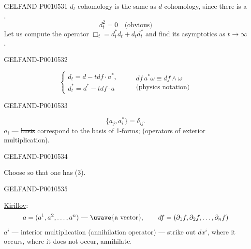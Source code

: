 \begin{GelfandAdjacentEvidence}{GELFAND-P001053}{1}
$d_t$-cohomology is the same as $d$-cohomology, since there is a .
\[
d_t^2=0\quad\text{(obvious)}
\]
Let us compute the operator $\Box_t=d_t^*d_t+d_td_t^*$ and find its asymptotics
as $t\to\infty$.
\end{GelfandAdjacentEvidence}
\begin{GelfandAdjacentEvidence}{GELFAND-P001053}{2}

\begin{equation*}
\begin{cases}
d_t=d-tdf\cdot a^*,\\
d_t^*=d^*-tdf\cdot a
\end{cases}
\qquad
\begin{gathered}
df\,a^*\omega\equiv df\wedge\omega\\
\text{(physics notation)}
\end{gathered}
\tag{2}
\end{equation*}
\end{GelfandAdjacentEvidence}
\begin{GelfandAdjacentEvidence}{GELFAND-P001053}{3}

\begin{equation*}
\{a_j,a_i^*\}=\delta_{ij}.
\tag{3}
\end{equation*}
$a_i$ — \sout{basis} correspond to the basis of 1-forms;
(operators of exterior multiplication).
\end{GelfandAdjacentEvidence}
\begin{GelfandAdjacentEvidence}{GELFAND-P001053}{4}


Choose so that one has (3).
\end{GelfandAdjacentEvidence}
\begin{GelfandAdjacentEvidence}{GELFAND-P001053}{5}


\underline{Kirillov}:
\[
a=(a^1,a^2,\ldots,a^n)\text{ — \uwave{a vector}},\qquad
df=(\partial_1f,\partial_2f,\ldots,\partial_nf)
\]
$a^i$ — interior multiplication (annihilation operator) — strike out $dx^i$, where it occurs,
where it does not occur, annihilate.
\end{GelfandAdjacentEvidence}
